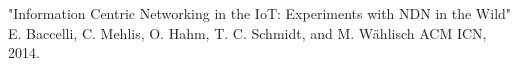 \documentclass[a4paper, twoside]{article}
\begin{document}
\begin{thebibliography}{1}
	 "Information Centric Networking in the IoT: Experiments with NDN in the Wild" 
	E. Baccelli, C. Mehlis, O. Hahm, T. C. Schmidt, and M. Wählisch ACM ICN, 2014.
\end{thebibliography} 
\end{document}
